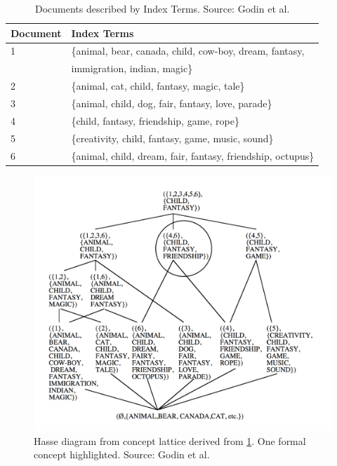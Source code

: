 \documentclass[11pt]{report}
\begin{document}
\begin{table}[h]
\caption{Documents described by Index Terms. Source: Godin et al. \cite{Godin1993}}
\label{table:fcair}
\centering

\def\arraystretch{1.2}%
\begin{tabular}{ | l | l | }
\hline
 Document & Index Terms \\
\hline

1 & \{animal, bear, canada, child, cow-boy, dream, fantasy,\\
  & immigration, indian, magic\} \\
2 & \{animal, cat, child, fantasy, magic, tale\} \\
3 & \{animal, child, dog, fair, fantasy, love, parade\} \\
4 & \{child, fantasy, friendship, game, rope\} \\
5 & \{creativity, child, fantasy, game, music, sound\} \\
6 & \{animal, child, dream, fair, fantasy, friendship, octupus\} \\

\hline
\end{tabular}
\end{table}

\begin{figure}[!ht]
	\centering
	\includegraphics[width=\linewidth]{./images/fcair}
\caption{Hasse diagram from concept lattice derived from \ref{table:fcair}. One formal concept highlighted. Source: Godin et al. \cite{Godin1993}}
\label{figure:fcair}
\end{figure}
\end{document}
